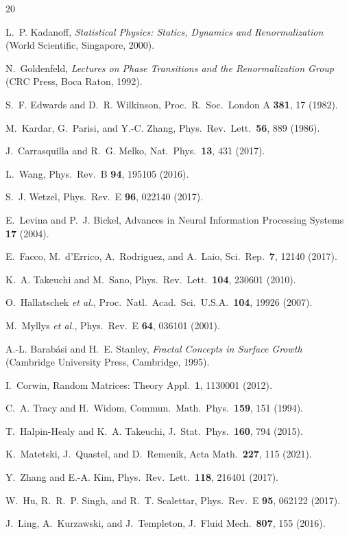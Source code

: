 \documentclass[aps,prl,twocolumn,superscriptaddress,showpacs]{revtex4-2}
\begin{document}
\begin{thebibliography}{20}

L.~P. Kadanoff, \emph{Statistical Physics: Statics, Dynamics and Renormalization} (World Scientific, Singapore, 2000).

N.~Goldenfeld, \emph{Lectures on Phase Transitions and the Renormalization Group} (CRC Press, Boca Raton, 1992).

S.~F. Edwards and D.~R. Wilkinson, Proc.\ R.\ Soc.\ London A \textbf{381}, 17 (1982).

M.~Kardar, G.~Parisi, and Y.-C. Zhang, Phys.\ Rev.\ Lett.\ \textbf{56}, 889 (1986).

J.~Carrasquilla and R.~G. Melko, Nat.\ Phys.\ \textbf{13}, 431 (2017).

L.~Wang, Phys.\ Rev.\ B \textbf{94}, 195105 (2016).

S.~J. Wetzel, Phys.\ Rev.\ E \textbf{96}, 022140 (2017).

E.~Levina and P.~J. Bickel, Advances in Neural Information Processing Systems \textbf{17} (2004).

E.~Facco, M.~d'Errico, A.~Rodriguez, and A.~Laio, Sci.\ Rep.\ \textbf{7}, 12140 (2017).

K.~A. Takeuchi and M.~Sano, Phys.\ Rev.\ Lett.\ \textbf{104}, 230601 (2010).

O.~Hallatschek \emph{et al.}, Proc.\ Natl.\ Acad.\ Sci.\ U.S.A.\ \textbf{104}, 19926 (2007).

M.~Myllys \emph{et al.}, Phys.\ Rev.\ E \textbf{64}, 036101 (2001).

A.-L. Barab\'asi and H.~E. Stanley, \emph{Fractal Concepts in Surface Growth} (Cambridge University Press, Cambridge, 1995).

I.~Corwin, Random Matrices: Theory Appl.\ \textbf{1}, 1130001 (2012).

C.~A. Tracy and H.~Widom, Commun.\ Math.\ Phys.\ \textbf{159}, 151 (1994).

T.~Halpin-Healy and K.~A. Takeuchi, J.\ Stat.\ Phys.\ \textbf{160}, 794 (2015).

K.~Matetski, J.~Quastel, and D.~Remenik, Acta Math.\ \textbf{227}, 115 (2021).

Y.~Zhang and E.-A. Kim, Phys.\ Rev.\ Lett.\ \textbf{118}, 216401 (2017).

W.~Hu, R.~R.~P. Singh, and R.~T. Scalettar, Phys.\ Rev.\ E \textbf{95}, 062122 (2017).

J.~Ling, A.~Kurzawski, and J.~Templeton, J.\ Fluid Mech.\ \textbf{807}, 155 (2016).

\end{thebibliography}
\end{document}
